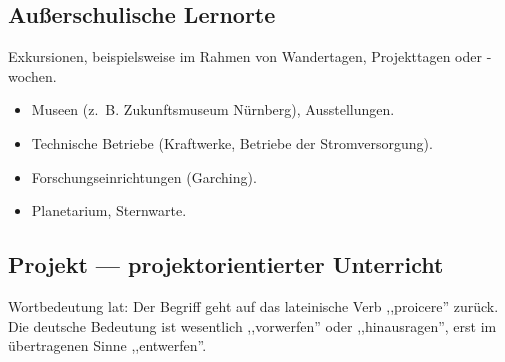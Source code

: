 \subsection{Au{\ss}erschulische Lernorte}

Exkursionen, beispielsweise im Rahmen von Wandertagen,
Projekttagen oder -wochen.

\begin{beisp2}
	\begin{itemize}
\item Museen (z.~B. Zukunftsmuseum Nürnberg), Ausstellungen.
\item Technische Betriebe
(Kraftwerke, Betriebe der Stromversorgung).
\item Forschungseinrichtungen (Garching).
\item Planetarium, Sternwarte.
\end{itemize}
\end{beisp2}



\subsection{Projekt --- projektorientierter Unterricht}

Wortbedeutung lat: Der Begriff geht auf das lateinische Verb
,,proicere'' zur\"{u}ck.
Die deutsche Bedeutung ist wesentlich ,,vorwerfen'' oder
,,hinausragen'', erst im \"{u}bertragenen Sinne ,,entwerfen''.

